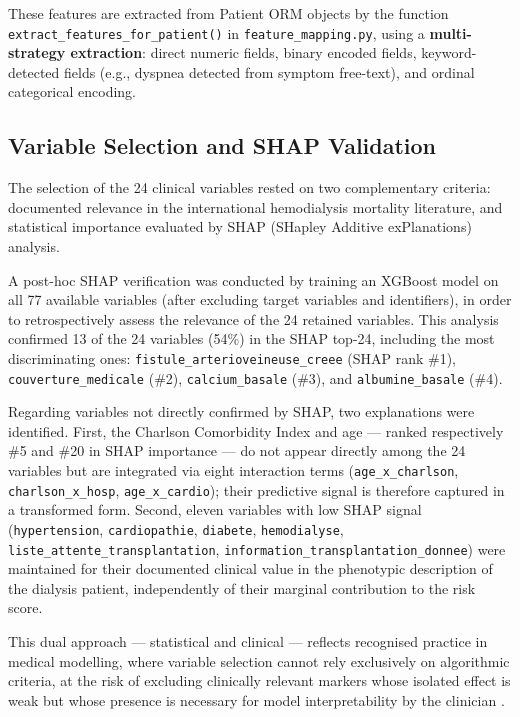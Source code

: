 \documentclass[12pt,a4paper,twoside]{report}
\begin{document}
These features are extracted from Patient ORM objects by the function \texttt{extract\_\allowbreak features\_\allowbreak for\_\allowbreak patient()} in \texttt{feature\_\allowbreak mapping.py}, using a \textbf{multi-strategy extraction}: direct numeric fields, binary encoded fields, keyword-detected fields (e.g., dyspnea detected from symptom free-text), and ordinal categorical encoding.

\FloatBarrier
\subsection{Variable Selection and SHAP Validation}
\label{sec:shap_validation}

The selection of the 24 clinical variables rested on two complementary criteria: documented relevance in the international hemodialysis mortality literature, and statistical importance evaluated by SHAP (SHapley Additive exPlanations) analysis.

A post-hoc SHAP verification was conducted by training an XGBoost model on all 77 available variables (after excluding target variables and identifiers), in order to retrospectively assess the relevance of the 24 retained variables. This analysis confirmed 13 of the 24 variables (54\%) in the SHAP top-24, including the most discriminating ones: \texttt{fistule\_arterioveineuse\_creee} (SHAP rank \#1), \texttt{couverture\_medicale} (\#2), \texttt{calcium\_basale} (\#3), and \texttt{albumine\_basale} (\#4).

Regarding variables not directly confirmed by SHAP, two explanations were identified. First, the Charlson Comorbidity Index and age --- ranked respectively \#5 and \#20 in SHAP importance --- do not appear directly among the 24 variables but are integrated via eight interaction terms (\texttt{age\_x\_charlson}, \texttt{charlson\_x\_hosp}, \texttt{age\_x\_cardio}); their predictive signal is therefore captured in a transformed form. Second, eleven variables with low SHAP signal (\texttt{hypertension}, \texttt{cardiopathie}, \texttt{diabete}, \texttt{hemodialyse}, \texttt{liste\_attente\_transplantation}, \texttt{information\_transplantation\_donnee}) were maintained for their documented clinical value in the phenotypic description of the dialysis patient, independently of their marginal contribution to the risk score.

This dual approach --- statistical and clinical --- reflects recognised practice in medical modelling, where variable selection cannot rely exclusively on algorithmic criteria, at the risk of excluding clinically relevant markers whose isolated effect is weak but whose presence is necessary for model interpretability by the clinician \cite{charlson1987, albumin_dialysis_2018, kdigo2015}.
\end{document}
